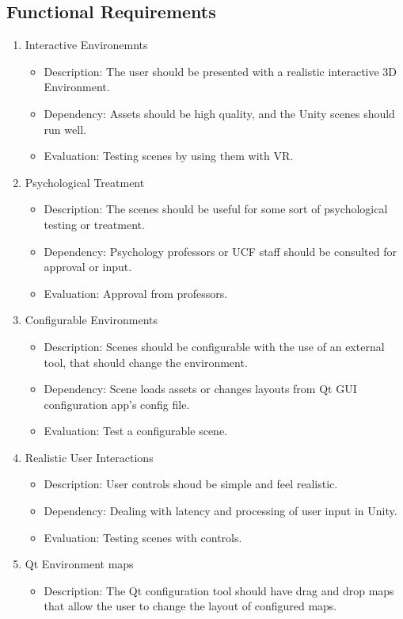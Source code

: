 \documentclass[a4paper,10pt]{article}
\begin{document}
	\subsection{Functional Requirements}
	\begin{enumerate}
		\item Interactive Environemnts
		\begin{itemize}
		 \item Description: The user should be presented with a realistic interactive 3D Environment. 
		 \item Dependency: Assets should be high quality, and the Unity scenes should run well.
		 \item Evaluation: Testing scenes by using them with VR.
		\end{itemize}
		\item Psychological Treatment
		\begin{itemize}
		 \item Description: The scenes should be useful for some sort of psychological testing or treatment.
		 \item Dependency:  Psychology professors or UCF staff should be consulted for approval or input.
		 \item Evaluation:  Approval from professors. 
		\end{itemize}
		\item Configurable Environments
		\begin{itemize} 
		 \item Description: Scenes should be configurable with the use of an external tool, that should change the environment. 
		 \item Dependency:  Scene loads assets or changes layouts from Qt GUI configuration app's config file. 
		 \item Evaluation:  Test a configurable scene.
		\end{itemize}
		\item Realistic User Interactions
		\begin{itemize}
		 \item Description: User controls shoud be simple and feel realistic. 
		 \item Dependency:  Dealing with latency and processing of user input in Unity. 
		 \item Evaluation:  Testing scenes with controls.
		\end{itemize}
		\item Qt Environment maps
		\begin{itemize}
		 \item Description: The Qt configuration tool should have drag and drop maps that allow the user to change the layout of configured maps.

\end{itemize}
\end{enumerate}
\end{document}
